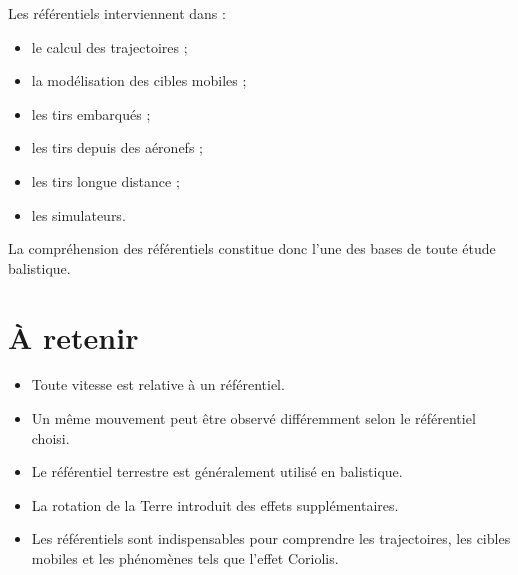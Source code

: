 Les référentiels interviennent dans :

\begin{itemize}
    \item le calcul des trajectoires ;
    \item la modélisation des cibles mobiles ;
    \item les tirs embarqués ;
    \item les tirs depuis des aéronefs ;
    \item les tirs longue distance ;
    \item les simulateurs.
\end{itemize}

La compréhension des référentiels constitue donc l'une des bases de toute
étude balistique.

\section{À retenir}

\begin{aretenir}

\begin{itemize}
    \item Toute vitesse est relative à un référentiel.
    \item Un même mouvement peut être observé différemment selon le référentiel choisi.
    \item Le référentiel terrestre est généralement utilisé en balistique.
    \item La rotation de la Terre introduit des effets supplémentaires.
    \item Les référentiels sont indispensables pour comprendre les trajectoires, les cibles mobiles et les phénomènes tels que l'effet Coriolis.
\end{itemize}

\end{aretenir}
